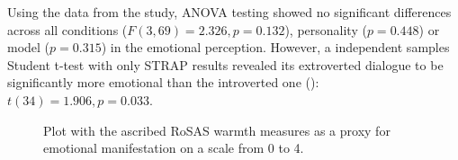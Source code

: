 \documentclass[nomenclature, english, biblatex]{kththesis}
\begin{document}
        
        


Using the data from the study, \gls{ANOVA} testing showed no significant differences across all conditions ($F(3, 69)=2.326, p=0.132$), personality ($p=0.448$) or model ($p=0.315$) in the emotional perception. However, a independent samples Student t-test with only STRAP results revealed its extroverted dialogue to be significantly more emotional than the introverted one (): $t(34)=1.906, p=0.033$.

\begin{figure}[ht]
    \centering
    \begin{adjustbox}{max width=\textwidth}
        
    \end{adjustbox}
    \caption{Plot with the ascribed RoSAS warmth measures as a proxy for emotional manifestation on a scale from 0 to 4.}
    \label{fig:study_rq5}
\end{figure}
\end{document}

